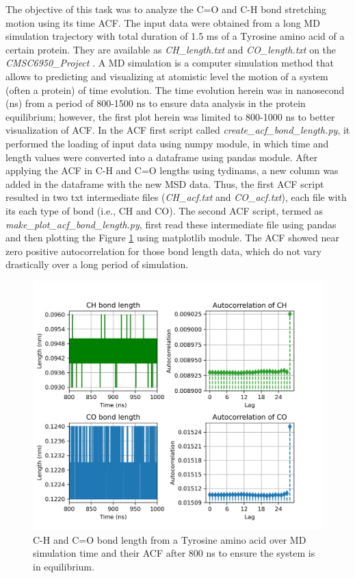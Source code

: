 \documentclass{article}
\begin{document}
The objective of this task was to analyze the C=O and C-H bond stretching motion using its time ACF. The input data were obtained from a long MD simulation trajectory with total duration of 1.5 ms of a Tyrosine amino acid of a certain protein. They are available as {\it CH\_length.txt} and {\it CO\_length.txt} on the {\it CMSC6950\_Project }. A MD simulation is a computer simulation method that allows to predicting and visualizing at atomistic level the motion of a system (often a protein) of time evolution. The time evolution herein was in nanosecond (ns) from a period of 800-1500 ns to ensure data analysis in the protein equilibrium; however, the first plot herein was limited to 800-1000 ns to better visualization of ACF. In the ACF first script called {\it create\_acf\_bond\_length.py}, it performed the loading of input data using numpy module, in which time and length values were converted into a dataframe using pandas module. After applying the ACF in C-H and C=O lengths using tydinams, a new column was added in the dataframe with the new MSD data. Thus, the first ACF script resulted in two txt intermediate files ({\it CH\_acf.txt} and {\it CO\_acf.txt}), each file with its each type of bond (i.e., CH and CO). The second ACF script, termed as {\it make\_plot\_acf\_bond\_length.py}, first read these intermediate file using pandas and then plotting the Figure \ref{fig:acf_plot} using matplotlib module. The ACF showed near zero positive autocorrelation for those bond length data, which do not vary drastically over a long period of simulation.

\begin{figure}[H]
\centering
\includegraphics[width=\linewidth]{CO_CH_length_acf_plot.png}
\caption{C-H and C=O bond length from a Tyrosine amino acid over MD simulation time and their ACF after 800 ns to ensure the system is in equilibrium.} 
\label{fig:acf_plot}
\end{figure}
\end{document}
